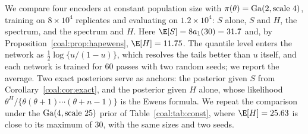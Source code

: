\begin{sloppypar}We compare four encoders at constant population size with $\pi(\theta)=\mathrm{Ga}(2,\text{scale }4)$, training on $8\times10^4$ replicates and evaluating on $1.2\times10^4$: $S$ alone, $S$ and $H$, the spectrum, and the spectrum and $H$. Here $\E[S]=8a_1(30)=31.7$ and, by Proposition~\ref{coal:prop:hapewens}, $\E[H]=11.75$. The quantile level enters the network as $\tfrac12\log\{u/(1-u)\}$, which resolves the tails better than $u$ itself, and each network is trained for 60 passes with two random seeds; we report the average. Two exact posteriors serve as anchors: the posterior given $S$ from Corollary~\ref{coal:cor:exact}, and the posterior given $H$ alone, whose likelihood $\theta^H/\{\theta(\theta+1)\cdots(\theta+n-1)\}$ is the Ewens formula. We repeat the comparison under the $\mathrm{Ga}(4,\text{scale }25)$ prior of Table~\ref{coal:tab:const}, where $\E[H]=25.63$ is close to its maximum of 30, with the same sizes and two seeds.\end{sloppypar}

